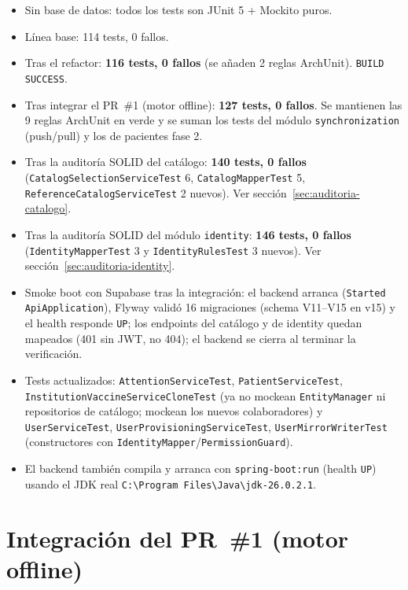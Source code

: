\documentclass[11pt,a4paper]{article}
\begin{document}
\begin{itemize}
  \item Sin base de datos: todos los tests son JUnit 5 + Mockito puros.
  \item Línea base: 114 tests, 0 fallos.
  \item Tras el refactor: \textbf{116 tests, 0 fallos} (se añaden 2 reglas
        ArchUnit). \texttt{BUILD SUCCESS}.
  \item Tras integrar el PR~\#1 (motor offline): \textbf{127 tests, 0 fallos}.
        Se mantienen las 9 reglas ArchUnit en verde y se suman los tests del
        módulo \texttt{synchronization} (push/pull) y los de pacientes fase 2.
  \item Tras la auditoría SOLID del catálogo: \textbf{140 tests, 0 fallos}
        (\texttt{CatalogSelectionServiceTest} 6, \texttt{CatalogMapperTest} 5,
        \texttt{ReferenceCatalogServiceTest} 2 nuevos). Ver
        sección~\ref{sec:auditoria-catalogo}.
  \item Tras la auditoría SOLID del módulo \texttt{identity}:
        \textbf{146 tests, 0 fallos} (\texttt{IdentityMapperTest} 3 y
        \texttt{IdentityRulesTest} 3 nuevos). Ver
        sección~\ref{sec:auditoria-identity}.
  \item Smoke boot con Supabase tras la integración: el backend arranca
        (\texttt{Started ApiApplication}), Flyway validó 16 migraciones
        (schema V11--V15 en v15) y el health responde \texttt{UP}; los
        endpoints del catálogo y de identity quedan mapeados (401 sin JWT, no
        404); el backend se cierra al terminar la verificación.
  \item Tests actualizados: \texttt{AttentionServiceTest},
        \texttt{PatientServiceTest}, \texttt{InstitutionVaccineServiceCloneTest}
        (ya no mockean \texttt{EntityManager} ni repositorios de catálogo;
        mockean los nuevos colaboradores) y \texttt{UserServiceTest},
        \texttt{UserProvisioningServiceTest}, \texttt{UserMirrorWriterTest}
        (constructores con \texttt{IdentityMapper}/\texttt{PermissionGuard}).
  \item El backend también compila y arranca con \texttt{spring-boot:run}
        (health \texttt{UP}) usando el JDK real
        \texttt{C:\textbackslash Program Files\textbackslash Java\textbackslash jdk-26.0.2.1}.
\end{itemize}

\section{Integración del PR~\#1 (motor offline)} \label{sec:integracion}
\end{document}
